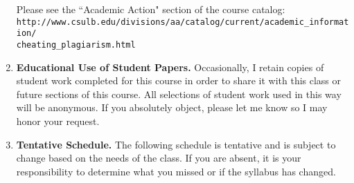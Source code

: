 \documentclass[9pt]{article}
\begin{document}
\begin{enumerate}
         Please see the ``Academic
         Action" section of the course catalog: \\
         \verb|http://www.csulb.edu/divisions/aa/catalog/current/academic_information/|\\
         \verb|cheating_plagiarism.html|
   \item \textbf{Educational Use of Student Papers.} Occasionally, I retain copies
   of student work completed for this course in order to share it with this class
   or future sections of this course. All selections of student work used in this
   way will be anonymous. If you absolutely object, please let me know so I may
   honor your request.
   
   \item \textbf{Tentative Schedule.} The following schedule is tentative and is
         subject to change based on the needs of the class. If you are absent,
         it is your responsibility to determine what you missed or if the
         syllabus has changed.
         

\end{enumerate}
\end{document}
